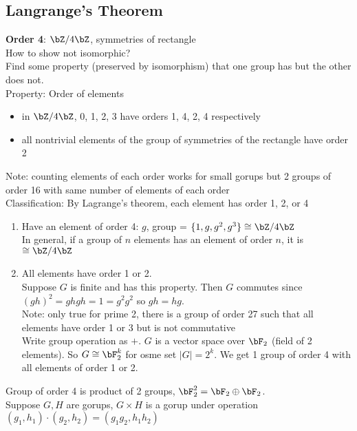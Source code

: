 
\subsection{Langrange's Theorem}

\textbf{Order 4}: $\bZ/4\bZ$, symmetries of rectangle \\
How to show not isomorphic? \\
Find some property (preserved by isomorphism) that one group has but the other does not. \\

\noindent
Property: Order of elements 
\begin{itemize}
    \item in $\bZ/4\bZ$, 0, 1, 2, 3 have orders 1, 4, 2, 4 respectively 
    \item all nontrivial elements of the group of symmetries of the rectangle have order 2
\end{itemize}
Note: counting elements of each order works for small gorups but 2 groups of order 16 with same number of elements of each order \\

\noindent
Classification: By Lagrange's theorem, each element has order 1, 2, or 4 
\begin{enumerate}
    \item Have an element of order 4: $g$, group = $\{1, g, g^2, g^3\}\cong \bZ/4\bZ$ \\
    In general, if a group of $n$ elements has an element of order $n$, it is $\cong \bZ/4\bZ$
    \item All elements have order 1 or 2. \\
    Suppose $G$ is finite and has this property. Then $G$ commutes since $(gh)^2 = ghgh=1=g^2g^2$ so $gh = hg$. \\
    Note: only true for prime 2, there is a group of order 27 such that all elements have order 1 or 3 but is not commutative \\
    Write group operation as $+$. $G$ is a vector space over $\bF_2$ (field of 2 elements). So $G \cong \bF_2^k$ for osme set $|G|=2^k$. We get 1 group of order 4 with all elements of order 1 or 2. 
\end{enumerate}

\noindent
Group of order 4 is product of 2 groups, $\bF_2^2 = \bF_2 \oplus \bF_2$. \\
Suppose $G, H$ are gorups, $G \times H$ is a gorup under operation $(g_1, h_1) \cdot (g_2, h_2) = (g_1g_2, h_1h_2)$

